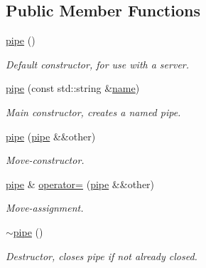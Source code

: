 \subsection*{Public Member Functions}
\begin{DoxyCompactItemize}
\item 
\mbox{\label{classcpen333_1_1process_1_1posix_1_1pipe_ae449d2fa72e6a83ed3f2ecfca1444e7f}} 
\hyperlink{classcpen333_1_1process_1_1posix_1_1pipe_ae449d2fa72e6a83ed3f2ecfca1444e7f}{pipe} ()
\begin{DoxyCompactList}\small\item\em Default constructor, for use with a server. \end{DoxyCompactList}\item 
\hyperlink{classcpen333_1_1process_1_1posix_1_1pipe_ac39ea29cbd5084681acde6b02b27bf91}{pipe} (const std\+::string \&\hyperlink{classcpen333_1_1process_1_1impl_1_1named__resource__base_a53986a0a1dd26a3602b842c45613b79d}{name})
\begin{DoxyCompactList}\small\item\em Main constructor, creates a named pipe. \end{DoxyCompactList}\item 
\hyperlink{classcpen333_1_1process_1_1posix_1_1pipe_a0ee8e36b323420d783fdbcf253225677}{pipe} (\hyperlink{classcpen333_1_1process_1_1posix_1_1pipe}{pipe} \&\&other)
\begin{DoxyCompactList}\small\item\em Move-\/constructor. \end{DoxyCompactList}\item 
\hyperlink{classcpen333_1_1process_1_1posix_1_1pipe}{pipe} \& \hyperlink{classcpen333_1_1process_1_1posix_1_1pipe_ab0715b21ad951bff7da956bfe71c51d7}{operator=} (\hyperlink{classcpen333_1_1process_1_1posix_1_1pipe}{pipe} \&\&other)
\begin{DoxyCompactList}\small\item\em Move-\/assignment. \end{DoxyCompactList}\item 
\mbox{\label{classcpen333_1_1process_1_1posix_1_1pipe_a07ac40ab8d1a1157e0817ead25db9d3f}} 
\hyperlink{classcpen333_1_1process_1_1posix_1_1pipe_a07ac40ab8d1a1157e0817ead25db9d3f}{$\sim$pipe} ()
\begin{DoxyCompactList}\small\item\em Destructor, closes pipe if not already closed. \end{DoxyCompactList}\item 

\end{DoxyCompactItemize}
